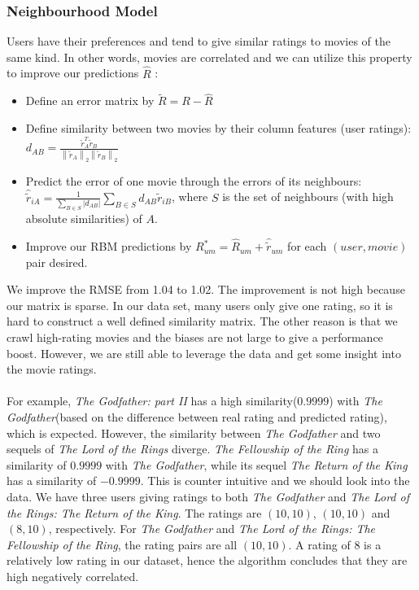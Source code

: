\begin{CJK*}{UTF8}{gbsn}
\subsubsection{Neighbourhood Model}
Users have their preferences and tend to give similar ratings to movies of the same kind. In other words, movies are correlated and we can utilize this property to improve our predictions $ \hat{R} $ :
\begin{itemize}
    \item Define an error matrix by $ \widetilde{R} = R - \hat{R} $
    \item Define similarity between two movies by their column features (user ratings): $ d_{A B}=\frac{\tilde{r}_{A}^{T} \widetilde{r}_{B}}{\left\|\widetilde{r}_{A}\right\|_{2}\left\|\widetilde{r}_{B}\right\|_{2}} $
    \item Predict the error of one movie through the errors of its neighbours: $ \hat{\tilde{r}}_{i A}=\frac{1}{\sum_{B \in S}\left|d_{A B}\right|} \sum_{B \in S} d_{A B} \widetilde{r}_{i B}  $, where $ S $ is the set of neighbours (with high absolute similarities) of $ A $.
    \item Improve our RBM predictions by $ R_{u m}^{*}=\hat{R}_{u m}+\hat{\tilde{r}}_{u m} $ for each $ (user, movie) $ pair desired.
\end{itemize}
We improve the RMSE from 1.04 to 1.02. The improvement is not high because our matrix is sparse. In our data set, many users only give one rating, so it is hard to construct a well defined similarity matrix. The other reason is that we crawl high-rating movies and the biases are not large to give a performance boost. However, we are still able to leverage the data and get some insight into the movie ratings. \\\\
For example, \textit{The Godfather: part II} has a high similarity($ 0.9999 $) with \textit{The Godfather}(based on the difference between real rating and predicted rating), which is expected. However, the similarity between \textit{The Godfather} and two sequels of \textit{The Lord of the Rings} diverge. \textit{The Fellowship of the Ring} has a similarity of $ 0.9999 $ with \textit{The Godfather}, while its sequel \textit{The Return of the King } has a similarity of $-0.9999 $. This is counter intuitive and we should look into the data. We have three users giving ratings to both \textit{The Godfather} and \textit{The Lord of the Rings: The Return of the King}. The ratings are $ (10, 10) $, $ (10, 10) $ and $ (8, 10) $, respectively. For \textit{The Godfather} and \textit{The Lord of the Rings: The Fellowship of the Ring}, the rating pairs are all $ (10, 10) $. A rating of 8 is a relatively low rating in our dataset, hence the algorithm concludes that they are high negatively correlated.


\end{CJK*}

